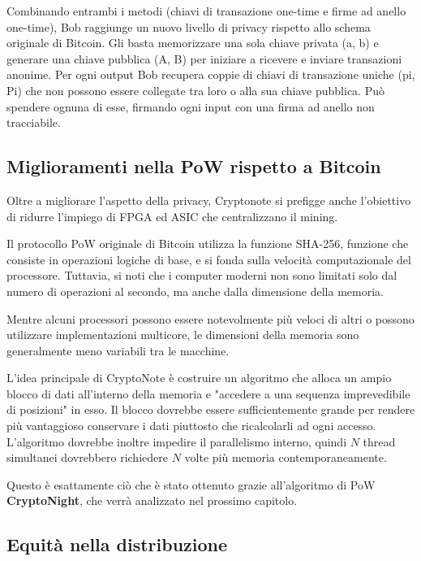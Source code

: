 Combinando entrambi i metodi (chiavi di transazione one-time e firme ad
anello one-time), Bob raggiunge un nuovo livello di privacy rispetto
allo schema originale di Bitcoin. Gli basta memorizzare una sola chiave
privata (a, b) e generare una chiave pubblica (A, B) per iniziare a
ricevere e inviare transazioni anonime. Per ogni output Bob recupera
coppie di chiavi di transazione uniche (pi, Pi) che non possono essere
collegate tra loro o alla sua chiave pubblica. Può spendere ognuna di
esse, firmando ogni input con una firma ad anello non tracciabile.


\subsection{Miglioramenti nella PoW rispetto a Bitcoin}\label{miglioramenti-nella-pow-rispetto-a-bitcoin}
Oltre a migliorare l'aspetto della privacy, Cryptonote si prefigge anche l'obiettivo di 
ridurre l'impiego di FPGA ed ASIC che centralizzano il mining.

Il protocollo PoW originale di Bitcoin utilizza la funzione SHA-256, funzione che
consiste in operazioni logiche di base, e si fonda sulla velocità computazionale del processore.
Tuttavia, si noti che i computer moderni non sono limitati solo
dal numero di operazioni al secondo, ma anche dalla dimensione della
memoria. 

Mentre alcuni processori possono essere notevolmente più veloci
di altri \cite{mining_hardware} o possono utilizzare implementazioni multicore, 
le dimensioni della memoria sono generalmente meno variabili tra le macchine.

L'idea principale di CryptoNote è costruire un algoritmo che alloca un
ampio blocco di dati all'interno della
memoria e "accedere a una sequenza imprevedibile di posizioni" in esso.
Il blocco dovrebbe essere sufficientemente grande per rendere più
vantaggioso conservare i dati piuttosto che ricalcolarli ad ogni
accesso. L'algoritmo dovrebbe inoltre impedire il
parallelismo interno, quindi $N$ thread simultanei dovrebbero richiedere $N$
volte più memoria contemporaneamente.

Questo è esattamente ciò che è stato ottenuto grazie all'algoritmo di PoW 
\textbf{CryptoNight}, che verrà analizzato nel prossimo capitolo.

\subsection{Equità nella distribuzione} \label{equituxe0-nella-distibuzione}
